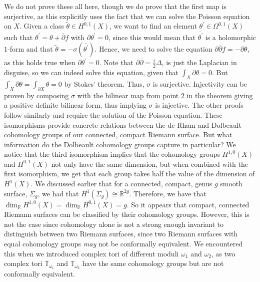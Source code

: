 \documentclass[11pt]{report}
\theoremstyle{definition}
\newenvironment{sproof}{%
  \renewcommand{\proofname}{Sketch Proof}\proof}{\endproof}
\begin{document}
\begin{sproof}
  We do not prove these all here, though we do prove that the first map is surjective, as this explicitly uses the fact that we can solve the Poisson equation on $X$. Given a class $\tilde{\theta} \in H^{0,1}(X)$, we want to find an element  $\theta^{\prime} \in \Omega^{0,1}(X)$ such that $\theta^{\prime} = \theta + \overline{\partial}f$ with $\partial \theta^{\prime} = 0$, since this would mean that $\overline{\theta^{\prime}}$ is a holomorphic $1$-form and that $\tilde{\theta} = -\sigma(\overline{\theta^{\prime}})$. Hence, we need to solve the equation $\partial\overline{\partial}f = -\partial \theta$, as this holds true when $\partial\theta^{\prime}=0$. Note that $\partial\overline{\partial} = \frac{i}{2}\Delta$, is just the Laplacian in disguise, so we can indeed solve this equation, given that $\int_X\partial \theta = 0$. But $\int_X\partial \theta = \int_{\partial X}\theta = 0$ by Stokes' theorem. Thus, $\sigma$ is surjective. Injectivity can be proven by composing $\sigma$ with the bilinear map from point $2$ in the theorem giving a positive definite bilinear form, thus implying $\sigma$ is injective. 
  The other proofs follow similarly and require the solution of the Poisson equation.
\end{sproof}
These isomorphisms provide concrete relations between the de Rham and Dolbeault cohomology groups of our connected, compact Riemann surface. But what information do the Dolbeault cohomology groups capture in particular? We notice that the third isomorphism implies that the cohomology groups $H^{1,0}(X)$ and $H^{0,1}(X)$ not only have the same dimension, but when combined with the first isomorphism, we get that each group takes half the value of the dimension of $H^1(X)$. We discussed earlier that for a connected, compact, genus $g$ smooth surface, $\Sigma_g$, we had that $H^1(\Sigma_g)\cong\mathbb{R}^{2g}$. Therefore, we have that $\dim_{\mathbb{R}}H^{1,0}(X)=\dim_{\mathbb{R}}H^{0,1}(X)=g$. So it appears that compact, connected Riemann surfaces can be classified by their cohomology groups. However, this is not the case since cohomology alone is not a strong enough invariant to distinguish between two Riemann surfaces, since two Riemann surfaces with equal cohomology groups \emph{may} not be conformally equivalent. We encountered this when we introduced complex tori of different moduli $\omega_1$ and $\omega_2$, as two complex tori $\mathbb{T}_{\omega_1}$ and $\mathbb{T}_{\omega_2}$ have the same cohomology groups but are not conformally equivalent.
\end{document}
